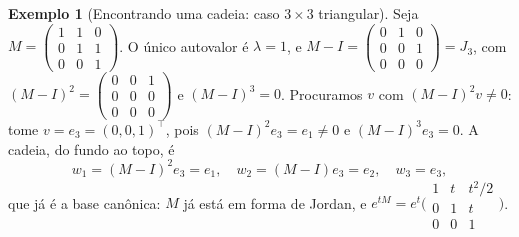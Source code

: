 \documentclass[11pt,a4paper]{amsart}
\theoremstyle{plain}
\theoremstyle{definition}
\newtheorem{exemplo}[teorema]{Exemplo}
\theoremstyle{remark}
\begin{document}
\begin{exemplo}[Encontrando uma cadeia: caso $3\times3$ triangular]
\label{ex:cadeia3}
Seja $M=\begin{pmatrix}1&1&0\\0&1&1\\0&0&1\end{pmatrix}$. O \'unico autovalor
\'e $\lambda=1$, e $M-I=\begin{pmatrix}0&1&0\\0&0&1\\0&0&0\end{pmatrix}=J_3$, com
$(M-I)^2=\begin{pmatrix}0&0&1\\0&0&0\\0&0&0\end{pmatrix}$ e $(M-I)^3=0$.
Procuramos $v$ com $(M-I)^2 v\neq0$: tome $v=e_3=(0,0,1)^\top$, pois
$(M-I)^2 e_3 = e_1\neq0$ e $(M-I)^3 e_3=0$. A cadeia, do fundo ao topo, \'e
\[
  w_1=(M-I)^2 e_3 = e_1,\quad w_2=(M-I)e_3=e_2,\quad w_3=e_3,
\]
que j\'a \'e a base can\^onica: $M$ j\'a est\'a em forma de Jordan, e
$e^{tM}=e^{t}\big(\begin{smallmatrix}1&t&t^2/2\\0&1&t\\0&0&1\end{smallmatrix}\big)$.
\end{exemplo}
\end{document}
